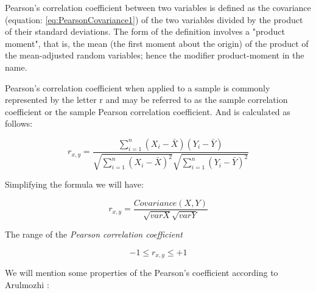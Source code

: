 Pearson's correlation coefficient between two variables is defined as the covariance (equation: \ref{eq:PearsonCovariance1}) of the two variables divided by the product of their standard deviations. The form of the definition involves a "product moment", that is, the mean (the first moment about the origin) of the product of the mean-adjusted random variables; hence the modifier product-moment in the name.

Pearson's correlation coefficient when applied to a sample is commonly represented by the letter r and may be referred to as the sample correlation coefficient or the sample Pearson correlation coefficient. And is calculated as follows: 

\begin{equation} \label{eq:PearsonExtended}
	r_{x,y} = \frac{\sum ^n _{i=1}(X_i - \bar{X})(Y_i - \bar{Y})}{\sqrt{\sum ^n _{i=1}(X_i - \bar{X})^2} \sqrt{\sum ^n _{i=1}(Y_i - \bar{Y})^2}}
\end{equation}

Simplifying the formula we will have:

\begin{equation} \label{eq:Pearson1}
	r_{x,y} = \frac{Covariance (X, Y)}{\sqrt{var X} \sqrt{var Y}}
\end{equation}

The range of the \emph{Pearson correlation coefficient}

\begin{equation} \label{eq:PearsonRange}
	-1 \leq r_{x,y} \leq +1
\end{equation}



We will mention some properties of the Pearson's coefficient according to Arulmozhi \cite{ARU2009}:

